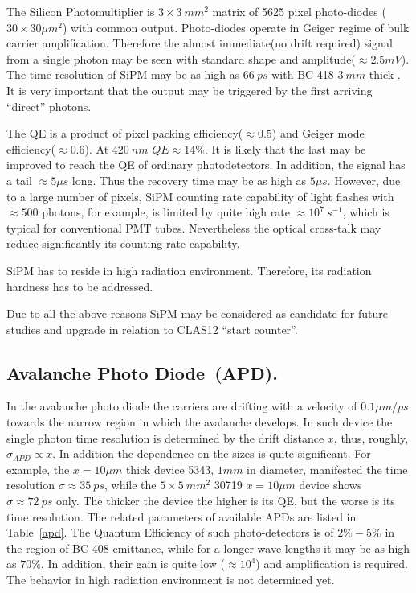 The Silicon Photomultiplier\cite{dolgo} is $3\times 3~mm^2$ matrix of 5625 
pixel 
photo-diodes ($30 \times 30 {\mu}m^2 $)  with common output. Photo-diodes operate in Geiger regime of 
bulk carrier amplification.
 Therefore the almost immediate(no drift required) signal from a single photon may be seen 
with standard shape and amplitude($\approx 2.5 mV$). 
The time resolution of  SiPM  may be as high as $66~ps$ \cite{dolgo} 
with BC-418 $3~mm$ thick . 
It is very important that the output 
may be triggered by the first arriving ``direct'' photons.

The QE is a product of pixel packing efficiency($\approx0.5$) and Geiger mode efficiency($\approx0.6$).
At $420~nm$ $QE\approx14\%$. It is likely that the last   may be improved to reach the QE of ordinary photodetectors.
In addition, the signal has a tail $\approx 5 {\mu}s$ long. Thus the recovery time may be as high as 
$5\mu s$. 
 However, due to a large number of pixels,
SiPM  counting rate capability of light flashes  with $\approx 500$ photons, for example, 
 is limited by quite high rate $\approx 10^7~s^{-1}$, which is   typical for conventional  PMT tubes. 
Nevertheless  the optical cross-talk may reduce significantly its counting rate capability.

SiPM  has to reside  in high radiation environment. Therefore, its 
radiation hardness has to be addressed.

Due to all the above reasons  SiPM may be considered as   candidate for 
future studies and upgrade  in relation to CLAS12 ``start counter''.
 

\subsection{Avalanche Photo Diode~(APD).}

In the avalanche photo diode\cite{apd} the carriers are drifting with a velocity of $0.1\mu m/ps$ towards the narrow
region in which the avalanche develops. In such device the 
single photon time resolution is determined by the drift distance $x$, thus, roughly,  $\sigma_{APD}\propto x$.
In addition the dependence on the sizes is quite significant.
 For example, the $x=10\mu m$ thick 
device 5343,  $1mm$ in diameter, manifested the time resolution 
$\sigma\approx35~ps$, while the $5\times5~mm^2$ 30719  $x=10\mu m$ device shows
 $\sigma\approx72~ps$ only. The thicker the device the higher is its QE, but the worse is  its time resolution.    
The related parameters of available APDs are listed in Table~\ref{apd}.
The Quantum Efficiency of such photo-detectors  is of $2\%-5\%$ in the region of BC-408 emittance, while for a longer wave lengths
it may be as high as $70\%$. 
In addition, their gain is quite low ($\approx10^4$) and amplification is required.
The behavior in high radiation environment is not determined yet.

